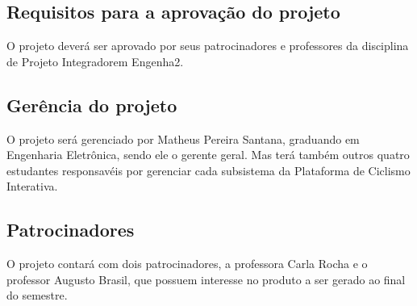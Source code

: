 \begin{apendicesenv}
\subsection{Requisitos para a aprovação do projeto}

O projeto deverá ser aprovado por seus patrocinadores e professores da disciplina de Projeto Integradorem Engenha2.

\subsection{Gerência do projeto}

O projeto será gerenciado por Matheus Pereira Santana, graduando em Engenharia Eletrônica, sendo ele o gerente geral. Mas terá também outros quatro estudantes responsavéis por gerenciar cada subsistema da Plataforma de Ciclismo Interativa.

\subsection{Patrocinadores}

O projeto contará com dois patrocinadores, a professora Carla Rocha e o professor Augusto Brasil, que possuem interesse no produto a ser gerado ao final do semestre. 

\end{apendicesenv}
